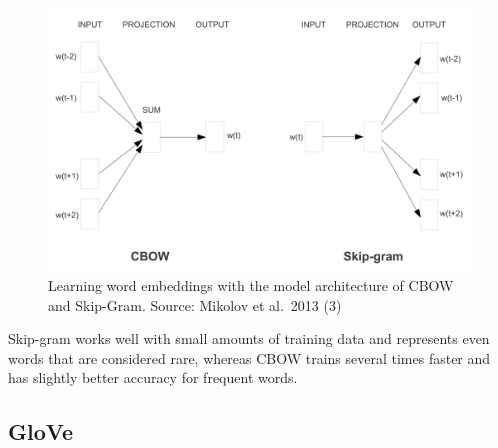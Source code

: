 \documentclass[]{krantz}
\begin{document}
\begin{figure}
\centering
\includegraphics{figures/01-01-foundations-applications-of-modern-NLP/01-01_word2vec.png}
\caption{\label{fig:word2vec}Learning word embeddings with the model architecture of CBOW and Skip-Gram. Source: Mikolov et al.~2013 (3)}
\end{figure}

Skip-gram works well with small amounts of training data and represents even words that are considered rare, whereas CBOW trains several times faster and has slightly better accuracy for frequent words.

\hypertarget{glove}{%
\subsection{GloVe}\label{glove}}
\end{document}
